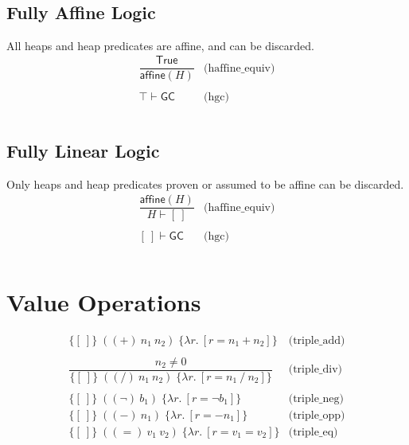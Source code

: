 \documentclass[10pt,a4paper]{article}
\newcommand{\emp}{[\: ]} %
\newcommand{\himpl}{\vdash}
\newcommand{\haffine}[1]{\mathsf{affine}(#1)}
\newcommand{\triple}[3]{\{#2\}\;#1\;\{#3\}}
\newcommand{\hgc}{\mathsf{GC}} %
\newcommand{\valint}[1]{#1}
\newcommand{\valbool}[1]{#1}
\newcommand{\isTrue}[1]{#1}
\newcommand{\Zquot}[2]{#1 \mathbin{/} #2}
\newcommand{\fun}[2]{\lambda #1.~#2}
\begin{document}
\begin{multicols}{2}
\[\begin{array}{cl}
\end{array}
\]

\subsection*{Fully Affine Logic}
All heaps and heap predicates are affine, and can be discarded. 
\[
  \begin{array}{cl}
    \dfrac{\mathsf{True}}
    { \haffine{H} } & \text{(haffine\_equiv)} \\
    \\
        
    
    {\top}
    \himpl
    {\hgc} & \text{(hgc)} \\
  \\
  \end{array}
\]

\subsection*{Fully Linear Logic}
Only heaps and heap predicates proven or assumed to be affine can be discarded.
\[
\begin{array}{cl}
  \dfrac{\haffine{H}}
  {H \himpl \emp} & \text{(haffine\_equiv)} \\
\\
    
  {\emp}
  \himpl
   {\hgc} & \text{(hgc)} \\
  \\  
\end{array}
\]

\section*{Value Operations}
\[
\begin{array}{cl}
  \triple{((+)~n_1~n_2)}{\emp}{\fun{r}{[r = \valint{n_1 + n_2}]}} & \text{(triple\_add)} \\
\\
  \dfrac{n_2 \neq 0}
  {\triple{((/)~n_1~n_2)}{\emp}{\fun{r}{[r = \valint{\Zquot{n_1}{n_2}}]}}} & \text{(triple\_div)} \\
  \\
  \triple{((\neg)~b_1)}{\emp}{\fun{r}{[r = \valbool{\neg b_1}]}} & \text{(triple\_neg)} \\
  \triple{((-)~n_1)}{\emp}{\fun{r}{[r = \valint{-n_1}]}} & \text{(triple\_opp)} \\
  \triple{((=)~v_1~v_2)}{\emp}{\fun{r}{[r = \isTrue{v_1 = v_2}]}} & \text{(triple\_eq)} \\


\end{array}\]
\end{multicols}
\end{document}
